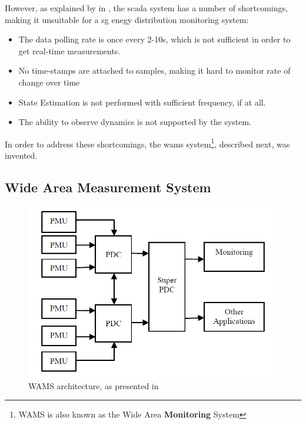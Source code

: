  





 




However, as explained by  in \Cite{zamani2020introduction}, the \acrshort{scada} system has a number of shortcomings, making it unsuitable for a \acrshort{sg} enegy distribution monitoring system:

\begin{itemize}
    \item The data polling rate is once every 2-10s, which is not sufficient in order to get real-time measurements.
    \item No time-stamps are attached to samples, making it hard to monitor rate of change over time
    \item State Estimation is not performed with sufficient frequency, if at all.
    \item The ability to observe dynamics is not supported by the system.
\end{itemize}





In order to address these shortcomings, the \acrfull{wams} system\footnote{WAMS is also known as the Wide Area \textbf{Monitoring} System}, described next, was invented.











\subsection{Wide Area Measurement System}
\begin{figure}[ht]
\includegraphics[width=\linewidth]{figures/Kumar-WAMS-architecture.png}
\caption[WAMS architecture]{WAMS architecture, as presented in \cite{kumar2015monitoring}}
\label{fig:Kumar-WAMS-architecture}
\end{figure}










